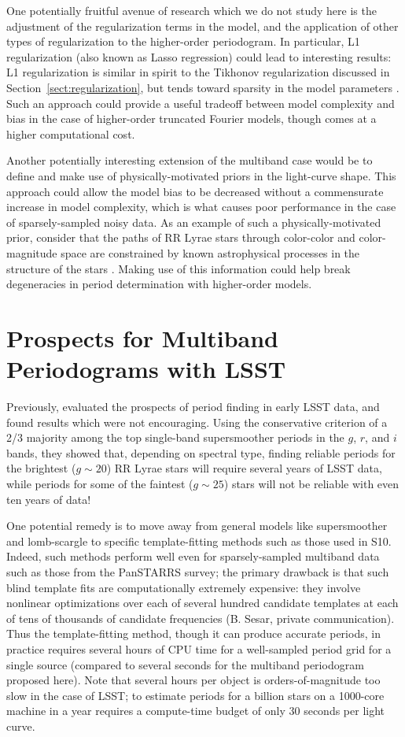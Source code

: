 \documentclass{emulateapj}
\newcommand{\Sect}[1]{Section~\ref{sect:#1}}
\newcommand{\sect}[1]{\Sect{#1}}
\newcommand{\sectlabel}[1]{\label{sect:#1}}
\begin{document}
One potentially fruitful avenue of research which we do not study here is the adjustment of the regularization terms in the model, and the application of other types of regularization to the higher-order periodogram.
In particular, L1 regularization (also known as Lasso regression) could lead to interesting results: L1 regularization is similar in spirit to the Tikhonov regularization discussed in \sect{regularization}, but tends toward sparsity in the model parameters \citep[see, e.g.][for a discussion]{ICVG2014}.
Such an approach could provide a useful tradeoff between model complexity and bias in the case of higher-order truncated Fourier models, though comes at a higher computational cost.

Another potentially interesting extension of the multiband case would be to define and make use of physically-motivated priors in the light-curve shape.
This approach could allow the model bias to be decreased without a commensurate increase in model complexity, which is what causes poor performance in the case of sparsely-sampled noisy data.
As an example of such a physically-motivated prior, consider that the paths of RR Lyrae stars through color-color and color-magnitude space are constrained by known astrophysical processes in the structure of the stars \citep[e.g., see Fig. 5 in][]{Szabo2014}. Making use of this information could help break degeneracies in period determination with higher-order models.

\section{Prospects for Multiband Periodograms with LSST}
\sectlabel{LSST}
Previously, \citet{Oluseyi12} evaluated the prospects of period finding in early LSST data, and found results which were not encouraging.
Using the conservative criterion of a 2/3 majority among the top single-band supersmoother periods in the $g$, $r$, and $i$ bands, they showed that, depending on spectral type, finding reliable periods for the brightest ($g \sim 20$) RR Lyrae stars will require several years of LSST data, while periods for some of the faintest ($g \sim 25$) stars will not be reliable with even ten years of data!

One potential remedy is to move away from general models like supersmoother and lomb-scargle to specific template-fitting methods such as those used in S10.
Indeed, such methods perform well even for sparsely-sampled multiband data such as those from the PanSTARRS survey; the primary drawback is that such blind template fits are computationally extremely expensive: they involve nonlinear optimizations over each of several hundred candidate templates at each of tens of thousands of candidate frequencies (B. Sesar, private communication).
Thus the template-fitting method, though it can produce accurate periods, in practice requires several hours of CPU time for a well-sampled period grid for a single source (compared to several seconds for the multiband periodogram proposed here).
Note that several hours per object is orders-of-magnitude too slow in the case of LSST; to estimate periods for a billion stars on a 1000-core machine in a year requires a compute-time budget of only 30 seconds per light curve.
\end{document}
